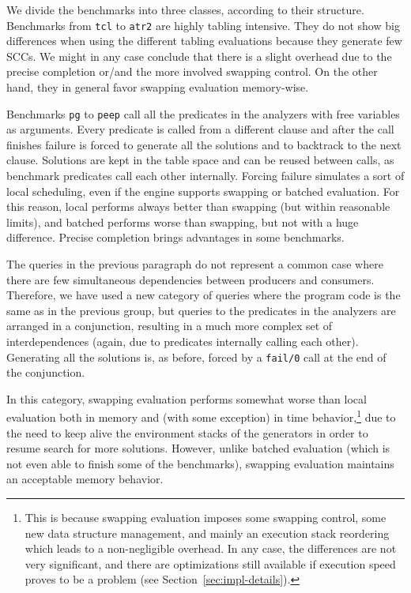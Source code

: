\documentclass{./tlp}
\renewcommand{\mnote}[1]{}
\begin{document}
We divide the benchmarks into three classes, according to their
structure. Benchmarks from \lstinline{tcl} to \lstinline{atr2} are
highly tabling intensive. They do not show big differences when using
the different tabling evaluations because they generate few SCCs. We
might in any case conclude that there is a slight
overhead due to the precise completion or/and the more involved
swapping control.
On the other hand, they in general favor swapping evaluation
memory-wise.


Benchmarks \lstinline{pg} to \lstinline{peep} call all the predicates
in the analyzers with free variables as arguments.  Every predicate is
called from a different clause and after the call finishes failure is
forced to generate all the solutions and to backtrack to the next
clause.  Solutions are kept in the table space and can be reused
between calls, as benchmark predicates call each other internally.
Forcing failure simulates a sort of local scheduling, even if the
engine supports swapping or batched evaluation.  For this reason,
local performs always better than swapping (but within reasonable
limits), and batched performs worse than swapping, but not with a huge
difference.  Precise completion brings advantages in some benchmarks.






The queries in the previous paragraph do not represent a common case
where there are few simultaneous dependencies between producers and
consumers.
Therefore, we have used a new category of queries where the program
code is the same as in the previous group, but queries to the
predicates in the analyzers are arranged in a conjunction, resulting
in a much more complex set of interdependences (again, due to
predicates internally calling each other). Generating all the solutions is, as before, forced by a \lstinline{fail/0}
call at the end of the conjunction.







 





In this category, swapping evaluation performs somewhat worse than
local evaluation both in memory and (with some exception) in time
behavior,\footnote{This is because swapping evaluation imposes some
  swapping control, some new data structure management, and mainly an
  execution stack reordering which leads to a non-negligible
  overhead. In any case, the differences are not very significant, and
  there are optimizations still available if execution speed proves to
  be a problem (see Section~\ref{sec:impl-details}).}  \mnote{hum?
  recheck footnote} due to the need to keep alive the environment
stacks of the generators in order to resume search for more solutions.
However, unlike batched evaluation (which is not even able to finish
some of the benchmarks), swapping evaluation maintains an acceptable
memory behavior.
\end{document}
